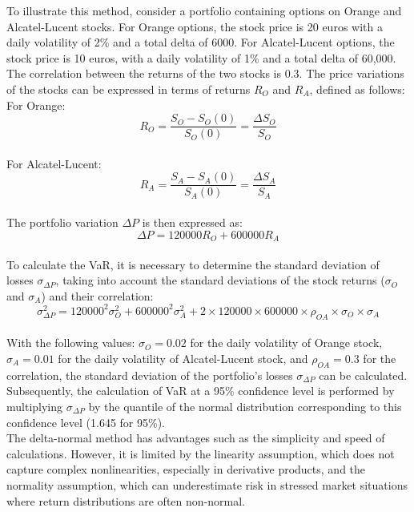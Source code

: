 \documentclass[a4paper,10pt]{article}
\begin{document}
\noindent To illustrate this method, consider a portfolio containing options on Orange and Alcatel-Lucent stocks. For Orange options, the stock price is 20 euros with a daily volatility of 2\% and a total delta of 6000. For Alcatel-Lucent options, the stock price is 10 euros, with a daily volatility of 1\% and a total delta of 60,000. The correlation between the returns of the two stocks is 0.3. The price variations of the stocks can be expressed in terms of returns \( R_O \) and \( R_A \), defined as follows:\\

\noindent For Orange:\\
\[R_O = \frac{S_O - S_O(0)}{S_O(0)} = \frac{\Delta S_O}{S_O}\]\\

\noindent For Alcatel-Lucent:\\
\[R_A = \frac{S_A - S_A(0)}{S_A(0)} = \frac{\Delta S_A}{S_A}\]\\

\noindent The portfolio variation \( \Delta P \) is then expressed as:\\
\[\Delta P = 120000R_O + 600000R_A\]\\

\noindent To calculate the VaR, it is necessary to determine the standard deviation of losses \( \sigma_{\Delta P} \), taking into account the standard deviations of the stock returns (\( \sigma_O \) and \( \sigma_A \)) and their correlation:\\
\[\sigma^2_{\Delta P} = 120000^2 \sigma_O^2 + 600000^2 \sigma_A^2 + 2 \times 120000 \times 600000 \times \rho_{OA} \times \sigma_O \times \sigma_A\]\\

\noindent With the following values: \( \sigma_O = 0.02 \) for the daily volatility of Orange stock, \( \sigma_A = 0.01 \) for the daily volatility of Alcatel-Lucent stock, and \( \rho_{OA} = 0.3 \) for the correlation, the standard deviation of the portfolio's losses \( \sigma_{\Delta P} \) can be calculated. Subsequently, the calculation of VaR at a 95\% confidence level is performed by multiplying \( \sigma_{\Delta P} \) by the quantile of the normal distribution corresponding to this confidence level (1.645 for 95\%).\\

\noindent The delta-normal method has advantages such as the simplicity and speed of calculations. However, it is limited by the linearity assumption, which does not capture complex nonlinearities, especially in derivative products, and the normality assumption, which can underestimate risk in stressed market situations where return distributions are often non-normal. \\
\end{document}
